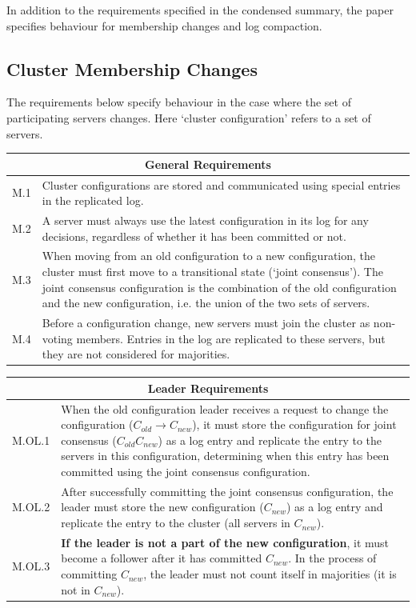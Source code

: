 \documentclass{article}
\begin{document}
    In addition to the requirements specified in the condensed summary, the paper specifies behaviour for membership changes and log compaction.
    \subsection{Cluster Membership Changes}
    The requirements below specify behaviour in the case where the set of participating servers changes. Here `cluster configuration' refers to a set of servers.
    
    \noindent \begin{tabular}{|p{}|p{}|}
        \hline
        \multicolumn{2}{|c|}{General Requirements}  \\ \hline
        M.1 & Cluster configurations are stored and communicated using special entries in the replicated log. \\ \hline
        M.2 & A server must always use the latest configuration in its log for any decisions, regardless of whether it has been committed or not. \\ \hline
        M.3 & When moving from an old configuration to a new configuration, the cluster must first move to a transitional state (`joint consensus'). The joint consensus configuration is the combination of the old configuration and the new configuration, i.e. the union of the two sets of servers.\\ \hline
        M.4 & Before a configuration change, new servers must join the cluster as non-voting members. Entries in the log are replicated to these servers, but they are not considered for majorities. \\ \hline
    \end{tabular}
    
    \hspace{2em}
    
    \noindent \begin{tabular}{|p{}|p{}|}
        \hline
        \multicolumn{2}{|c|}{Leader Requirements}  \\ \hline
        M.OL.1 & When the old configuration leader receives a request to change the configuration ($C_{old}\rightarrow C_{new}$), it must store the configuration for joint consensus ($C_{old}C_{new}$) as a log entry and replicate the entry to the servers in this configuration, determining when this entry has been committed using the joint consensus configuration. \\ \hline
        M.OL.2 & After successfully committing the joint consensus configuration, the leader must store the new configuration ($C_{new}$) as a log entry and replicate the entry to the cluster (all servers in $C_{new}$). \\ \hline
        M.OL.3 & \textbf{If the leader is not a part of the new configuration}, it must become a follower after it has committed $C_{new}$. In the process of committing $C_{new}$, the leader must not count itself in majorities (it is not in $C_{new}$).
    \end{tabular}
    
\end{document}
